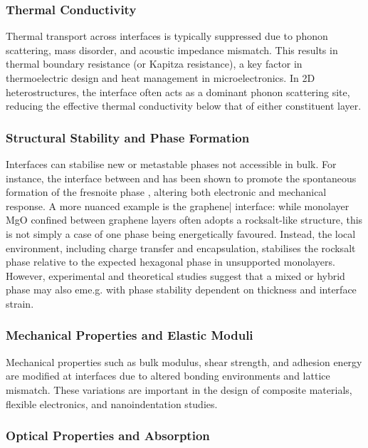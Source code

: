 \subsubsection{Thermal Conductivity}

Thermal transport across interfaces is typically suppressed due to phonon scattering, mass disorder, and acoustic
impedance mismatch. This results in thermal boundary resistance (or Kapitza resistance), a key factor in
thermoelectric design and heat management in microelectronics. In 2D heterostructures, the interface often acts as a
dominant phonon scattering site, reducing the effective thermal conductivity below that of either constituent layer.

\subsubsection{Structural Stability and Phase Formation}

Interfaces can stabilise new or metastable phases not accessible in bulk. For instance, the interface between
 and  has been shown to promote the spontaneous formation of the fresnoite phase ,
altering both electronic and mechanical response. A more nuanced example is the graphene| interface: while
monolayer MgO confined between graphene layers often adopts a rocksalt-like structure, this is not simply a case of
one phase being energetically favoured. Instead, the local environment, including charge transfer and encapsulation,
stabilises the rocksalt phase relative to the expected hexagonal phase in unsupported monolayers. However, experimental
and theoretical studies suggest that a mixed or hybrid phase may also eme.g. with phase stability dependent on
thickness and interface strain.

\subsubsection{Mechanical Properties and Elastic Moduli}

Mechanical properties such as bulk modulus, shear strength, and adhesion energy are modified at interfaces due to
altered bonding environments and lattice mismatch. These variations are important in the design of composite
materials, flexible electronics, and nanoindentation studies.

\subsubsection{Optical Properties and Absorption}

